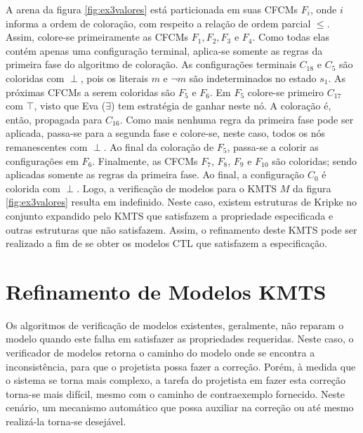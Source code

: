 \documentclass[normaltoc,capchap,capsec,times]{abnt}
\begin{document}
A arena da figura \ref{fig:ex3valores} está particionada em suas  CFCMs $F_i$, onde $i$ informa a ordem de coloração, com respeito a relação de ordem parcial $\leq$. Assim, colore-se primeiramente as CFCMs $F_1, F_2, F_3$ e $F_4$. Como todas elas contém apenas uma configuração terminal, aplica-se somente as regras da primeira fase do algoritmo de coloração. As configurações terminais $C_{18}$ e $C_{5}$ são coloridas com $\perp$, pois os literais $m$ e $\neg m$ são indeterminados no estado $s_1$. As próximas CFCMs a serem coloridas são $F_5$ e $F_6$. Em $F_5$ colore-se primeiro $C_{17}$ com $\top$, visto que Eva ($\exists$) tem estratégia de ganhar neste nó. A coloração é, então, propagada para $C_{16}$. Como mais nenhuma regra da primeira fase pode ser aplicada, passa-se para a segunda fase e colore-se, neste caso, todos os nós remanescentes com $\perp$. Ao final da coloração de $F_5$, passa-se a colorir as configurações em $F_6$. Finalmente, as CFCMs $F_7$, $F_8$, $F_9$ e $F_{10}$ são coloridas; sendo aplicadas somente as regras da primeira fase. Ao final, a configuração $C_0$ é colorida com $\perp$. Logo, a verificação de modelos para o KMTS $M$ da figura \ref{fig:ex3valores} resulta em indefinido. Neste caso, existem estruturas de Kripke no conjunto expandido pelo KMTS que satisfazem a propriedade especificada e outras estruturas que não satisfazem. Assim, o refinamento deste KMTS pode ser realizado a fim de se obter os modelos CTL que satisfazem a especificação. 

%

\chapter{Refinamento de Modelos KMTS}
\label{cap:refinamentoModelos}

Os algoritmos de verificação de modelos existentes, geralmente, não reparam o modelo quando este falha em satisfazer as propriedades requeridas. Neste caso, o verificador de modelos retorna o caminho do modelo onde se encontra a inconsistência, para que o projetista possa fazer a correção. Porém, à medida que o sistema se torna mais complexo, a tarefa do projetista em fazer esta correção torna-se mais difícil, mesmo com o caminho de contraexemplo fornecido. Neste cenário, um mecanismo automático que possa auxiliar na correção ou até mesmo realizá-la torna-se desejável. 
\end{document}
